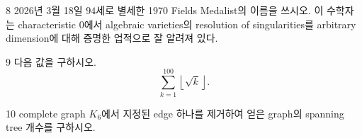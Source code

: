 \documentclass[11pt,oneside]{article}
\begin{document}
\begin{problem}{8}
2026년 3월 18일 $94$세로 별세한 1970 Fields Medalist의 이름을 쓰시오. 이 수학자는 characteristic $0$에서 algebraic varieties의 resolution of singularities를 arbitrary dimension에 대해 증명한 업적으로 잘 알려져 있다.
\end{problem}

\begin{problem}{9}
다음 값을 구하시오.
\[
    \sum_{k=1}^{100}\left\lfloor\sqrt{k}\right\rfloor.
\]
\end{problem}

\begin{problem}{10}
complete graph $K_6$에서 지정된 edge 하나를 제거하여 얻은 graph의 spanning tree 개수를 구하시오.
\end{problem}
\end{document}
